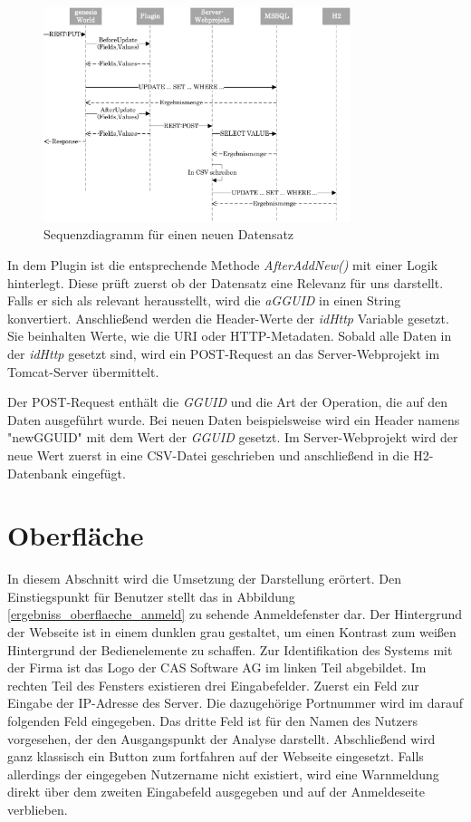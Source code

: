 \begin{figure}[htbp]
\centering
  \includegraphics[width=0.8\textwidth]{pics/sequenzdiagramm.pdf}
\caption{Sequenzdiagramm für einen neuen Datensatz}
\label{umsetzung_sequenz}
\end{figure}

In dem Plugin ist die entsprechende Methode \textit{AfterAddNew()} mit einer Logik hinterlegt. Diese prüft zuerst ob der Datensatz eine Relevanz für uns darstellt. Falls er sich als relevant herausstellt, wird die \textit{aGGUID} in einen String konvertiert. Anschließend werden die Header-Werte der \textit{idHttp} Variable gesetzt. Sie beinhalten Werte, wie die URI oder HTTP-Metadaten. Sobald alle Daten in der \textit{idHttp} gesetzt sind, wird ein POST-Request an das Server-Webprojekt im Tomcat-Server übermittelt. 

Der POST-Request enthält die \textit{GGUID} und die Art der Operation, die auf den Daten ausgeführt wurde. Bei neuen Daten beispielsweise wird ein Header namens "newGGUID" mit dem Wert der \textit{GGUID} gesetzt. Im Server-Webprojekt wird der neue Wert zuerst in eine CSV-Datei geschrieben und anschließend in die H2-Datenbank eingefügt.


\section{Oberfläche}

In diesem Abschnitt wird die Umsetzung der Darstellung erörtert. Den Einstiegspunkt für Benutzer stellt das in Abbildung \ref{ergebniss_oberflaeche_anmeld} zu sehende Anmeldefenster dar. Der Hintergrund der Webseite ist in einem dunklen grau gestaltet, um einen Kontrast zum weißen Hintergrund der Bedienelemente zu schaffen. Zur Identifikation des Systems mit der Firma ist das Logo der CAS Software AG im linken Teil abgebildet. Im rechten Teil des Fensters existieren drei Eingabefelder. Zuerst ein Feld zur Eingabe der IP-Adresse des Server. Die dazugehörige Portnummer wird im darauf folgenden Feld eingegeben. Das dritte Feld ist für den Namen des Nutzers vorgesehen, der den Ausgangspunkt der Analyse darstellt. Abschließend wird ganz klassisch ein Button zum fortfahren auf der Webseite eingesetzt. Falls allerdings der eingegeben Nutzername nicht existiert, wird eine Warnmeldung direkt über dem zweiten Eingabefeld ausgegeben und auf der Anmeldeseite verblieben. 


